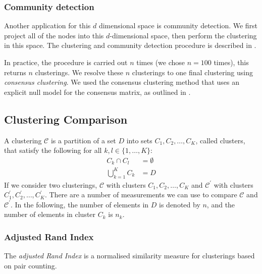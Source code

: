 \documentclass[a4paper,12pt]{article}
\theoremstyle{definition}
\begin{document}
        \subsubsection{Community detection}\label{sec:community_detection}
        Another application for this $d$ dimensional space is community detection. We first project all of the nodes into this $d$-dimensional space, then perform the clustering in this space. The clustering and community detection procedure is described in \cite{humphries2}.

        In practice, the procedure is carried out $n$ times (we chose $n=100$ times), this returns $n$ clusterings. We resolve these $n$ clusterings to one final clustering using \textit{consensus clustering}. We used the consensus clustering method that uses an explicit null model for the consensus matrix, as outlined in \cite{humphries}.

    \subsection{Clustering Comparison}\label{sec:clustering_comparison}
    A clustering $\mathcal{C}$ is a partition of a set $D$ into sets $C_1, C_2, \dots, C_K$, called clusters, that satisfy the following for all $k,l \in \lbrace 1,\dots,K \rbrace$:
    \begin{align}
        C_k \cap C_l &= \emptyset \\
        \bigcup_{k=1}^K C_k &= D
    \end{align}
    If we consider two clusterings, $\mathcal{C}$ with clusters $C_1, C_2, \dots, C_K$ and $\mathcal{C}^{\prime}$ with clusters \\ $C_1^{\prime}, C_2^{\prime}, \dots, C_K^{\prime}$. There are a number of measurements we can use to compare $\mathcal{C}$ and $\mathcal{C}^{\prime}$. In the following, the number of elements in $D$ is denoted by $n$, and the number of elements in cluster $C_k$ is $n_k$.

      \subsubsection{Adjusted Rand Index}\label{sec:adjusted_rand_index}
      The \textit{adjusted Rand Index} is a normalised similarity measure for clusterings based on pair counting.
\end{document}
